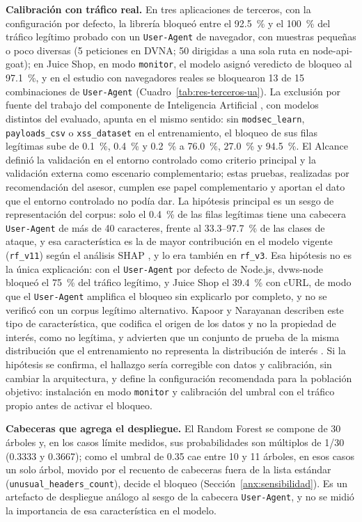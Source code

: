 \textbf{Calibración con tráfico real.} En tres aplicaciones de terceros, con la configuración por
defecto, la librería bloqueó entre el 92.5~\% y el 100~\% del tráfico legítimo probado con un
\texttt{User-Agent} de navegador, con muestras pequeñas o poco diversas (5 peticiones en DVNA; 50
dirigidas a una sola ruta en node-api-goat); en Juice Shop, en modo \texttt{monitor}, el modelo asignó
veredicto de bloqueo al 97.1~\%, y en el estudio con navegadores reales se bloquearon 13 de 15
combinaciones de \texttt{User-Agent} (Cuadro~\ref{tab:res-terceros-ua}). La exclusión por fuente del trabajo del componente de Inteligencia Artificial
\cite{valenzuela2026ia}, con modelos distintos del evaluado, apunta en el mismo
sentido: sin \texttt{modsec\_learn}, \texttt{payloads\_csv} o \texttt{xss\_dataset} en el entrenamiento, el
bloqueo de sus filas legítimas sube de 0.1~\%, 0.4~\% y 0.2~\% a 76.0~\%, 27.0~\% y 94.5~\%. El Alcance definió la validación en el entorno
controlado como criterio principal y la validación externa como escenario complementario; estas
pruebas, realizadas por recomendación del asesor, cumplen ese papel complementario y aportan el
dato que el entorno controlado no podía dar. La hipótesis principal es un sesgo de representación
del corpus: solo el 0.4~\% de las filas legítimas tiene una cabecera \texttt{User-Agent} de más de
40 caracteres, frente al 33.3--97.7~\% de las clases de ataque, y esa característica es la de mayor
contribución en el modelo vigente (\texttt{rf\_v11}) según el análisis SHAP \cite{lundberg2017unified,valenzuela2026ia}, y lo era también en
\texttt{rf\_v3}. Esa hipótesis no es la única explicación: con el \texttt{User-Agent} por defecto de
Node.js, dvws-node bloqueó el 75~\% del tráfico legítimo, y Juice Shop el 39.4~\% con cURL, de modo
que el \texttt{User-Agent} amplifica el bloqueo sin explicarlo por completo, y no se verificó con un
corpus legítimo alternativo. Kapoor y Narayanan describen este tipo
de característica, que codifica el origen de los datos y no la propiedad de interés, como no
legítima, y advierten que un conjunto de prueba de la misma distribución que el entrenamiento no
representa la distribución de interés \cite{kapoor2023}. Si la hipótesis se confirma, el hallazgo sería corregible con datos y
calibración, sin cambiar la arquitectura, y define la configuración recomendada para la población
objetivo: instalación en modo \texttt{monitor} y calibración del umbral con el tráfico propio antes
de activar el bloqueo.

\textbf{Cabeceras que agrega el despliegue.} El Random Forest se compone de 30 árboles y, en los
casos límite medidos, sus probabilidades son múltiplos de 1/30 (0.3333 y 0.3667); como el umbral de
0.35 cae entre 10 y 11 árboles, en esos casos un solo árbol, movido por el recuento de cabeceras
fuera de la lista estándar (\texttt{unusual\_headers\_count}), decide el bloqueo
(Sección~\ref{anx:sensibilidad}). Es un artefacto de despliegue análogo al sesgo de la cabecera
\texttt{User-Agent}, y no se midió la importancia de esa característica en el modelo.


